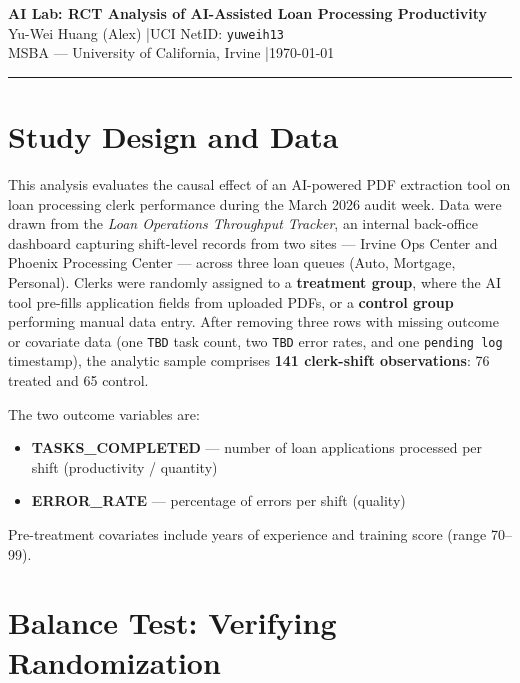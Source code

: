 \documentclass[12pt]{article}
\begin{document}
\begin{center}
    {\LARGE \textbf{AI Lab: RCT Analysis of AI-Assisted Loan Processing Productivity}}\\[0.8em]
    {\large Yu-Wei Huang (Alex) \quad|\quad UCI NetID: \texttt{yuweih13}}\\[0.4em]
    {\normalsize MSBA --- University of California, Irvine \quad|\quad \today}
\end{center}

\vspace{1em}\hrule\vspace{1.5em}

\section{Study Design and Data}

This analysis evaluates the causal effect of an AI-powered PDF extraction tool on
loan processing clerk performance during the March 2026 audit week. Data were drawn
from the \textit{Loan Operations Throughput Tracker}, an internal back-office dashboard
capturing shift-level records from two sites --- Irvine Ops Center and Phoenix
Processing Center --- across three loan queues (Auto, Mortgage, Personal). Clerks
were randomly assigned to a \textbf{treatment group}, where the AI tool pre-fills
application fields from uploaded PDFs, or a \textbf{control group} performing manual
data entry. After removing three rows with missing outcome or covariate data (one
\texttt{TBD} task count, two \texttt{TBD} error rates, and one \texttt{pending log}
timestamp), the analytic sample comprises \textbf{141 clerk-shift observations}:
76 treated and 65 control.

The two outcome variables are:
\begin{itemize}
    \item \textbf{TASKS\_COMPLETED} --- number of loan applications processed per shift (productivity / quantity)
    \item \textbf{ERROR\_RATE} --- percentage of errors per shift (quality)
\end{itemize}
Pre-treatment covariates include years of experience and training score (range 70--99).

\section{Balance Test: Verifying Randomization}
\end{document}
